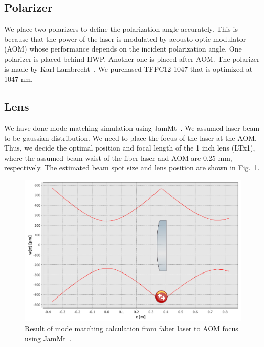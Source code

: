 \subsection{Polarizer}
We place two polarizers to define the polarization angle accurately. This is because that the power of the laser is modulated by acousto-optic modulator (AOM) whose performance depends on the incident polarization angle.
One polarizer is placed behind HWP. Another one is placed after AOM. The polarizer is made by Karl-Lambrecht~\cite{Karl_Lambrecht}. We purchased TFPC12-1047 that is optimized at 1047 nm. 

\subsection{Lens}
We have done mode matching simulation using JamMt~\cite{JamMt}. We assumed laser beam to be gaussian distribution. We need to place the focus of the laser at the AOM. Thus, we decide the optimal position and focal length of the 1 inch lens (LTx1), where the assumed beam waist of the fiber laser and AOM are 0.25 mm, respectively. The estimated beam spot size and lens position are shown in Fig.~\ref{fig:Mode_L1}.
\begin{figure}
\begin{center}
\includegraphics[bb=0 0 778.039983 507.026056, width=14cm]{Figures/AOM_modematching_Xend.png}
\caption{Result of mode matching calculation from faber laser to AOM focus using JamMt~\cite{JamMt}.} 
\label{fig:Mode_L1} 
\end{center}
\end{figure}

